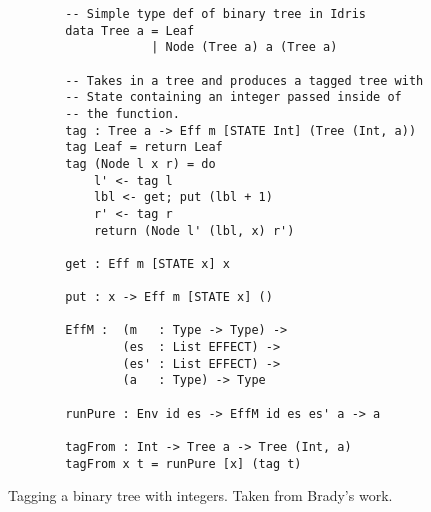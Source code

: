 \begin{figure}[h]
    \caption{Tagging a binary tree with integers. Taken from Brady's work.
    \protect\cite{algebraic}}
    \label{tag_def}
    \begin{lstlisting}
        -- Simple type def of binary tree in Idris
        data Tree a = Leaf
                    | Node (Tree a) a (Tree a)
        
        -- Takes in a tree and produces a tagged tree with
        -- State containing an integer passed inside of
        -- the function. 
        tag : Tree a -> Eff m [STATE Int] (Tree (Int, a))
        tag Leaf = return Leaf
        tag (Node l x r) = do
            l' <- tag l
            lbl <- get; put (lbl + 1)
            r' <- tag r
            return (Node l' (lbl, x) r')
        
        get : Eff m [STATE x] x
        
        put : x -> Eff m [STATE x] ()
        
        EffM :  (m   : Type -> Type) ->
                (es  : List EFFECT) ->
                (es' : List EFFECT) ->
                (a   : Type) -> Type
        
        runPure : Env id es -> EffM id es es' a -> a
        
        tagFrom : Int -> Tree a -> Tree (Int, a)
        tagFrom x t = runPure [x] (tag t)
    \end{lstlisting}
\end{figure}